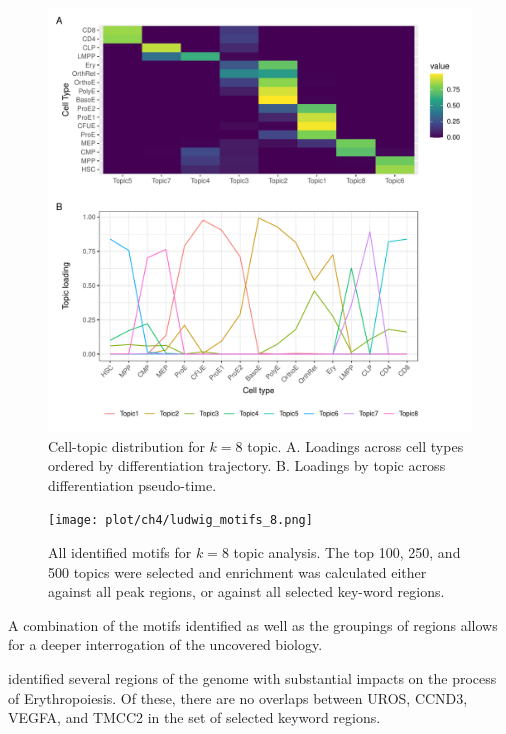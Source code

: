 \begin{figure}
  \centering
  \includegraphics[width=\textwidth]{plot/ch4/ludwig_quick_topic_8.pdf}
  \caption{Cell-topic distribution for $k=8$ topic. A. Loadings across cell types ordered by differentiation trajectory. B. Loadings by topic across differentiation pseudo-time.}
  \label{fig:ludwig_8_topic}
\end{figure}

\begin{figure}
  \centering
  \texttt{[image: plot/ch4/ludwig\_motifs\_8.png]}
  \caption{All identified motifs for $k=8$ topic analysis. The top 100, 250, and 500 topics were selected and enrichment was calculated either against all peak regions, or against all selected key-word regions. }
  \label{fig:ludwig_motifs_8}
\end{figure}

A combination of the motifs identified as well as the groupings of regions allows for a deeper interrogation of the uncovered biology.

\textcite{Ludwig2019} identified several regions of the genome with substantial impacts on the process of Erythropoiesis. Of these, there are no overlaps between UROS, CCND3, VEGFA, and TMCC2 in the set of selected keyword regions. 


